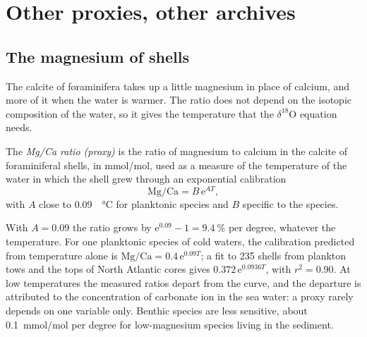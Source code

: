 \section{Other proxies, other archives}\label{sec:b2:climate-proxies:others}

\subsection*{The magnesium of shells}

The calcite of foraminifera takes up a little magnesium in place of calcium, and more of it when
the water is warmer. The ratio does not depend on the isotopic composition of the water, so it
gives the temperature that the $\delta^{18}$O equation needs.

\begin{definition}\label{def:b2:climate-proxies:mgca}
The \emph{Mg/Ca ratio (proxy)} is the ratio of magnesium to calcium in
the calcite of foraminiferal shells, in \unit{mmol/mol}, used as a measure of the temperature of
the water in which the shell grew through an exponential calibration
\[
  \text{Mg/Ca} = B\,\mathrm{e}^{A T},
\]
with $A$ close to \qty{0.09}{\per\celsius} for planktonic species and $B$ specific to the species.
\end{definition}

With $A = 0.09$ the ratio grows by $\mathrm{e}^{0.09} - 1 = \qty{9.4}{\percent}$ per degree,
whatever the temperature. For one planktonic species of cold waters, the calibration predicted from
temperature alone is $\text{Mg/Ca} = 0.4\,\mathrm{e}^{0.09T}$; a fit to 235 shells from plankton
tows and the tops of North Atlantic cores gives $0.372\,\mathrm{e}^{0.0936T}$, with $r^2 = 0.90$.
At low temperatures the measured ratios depart from the curve, and the departure is attributed to
the concentration of carbonate ion in the sea water: a proxy rarely depends on one variable only.
Benthic species are less sensitive, about \qty{0.1}{mmol/mol} per degree for low-magnesium
species living in the sediment.


